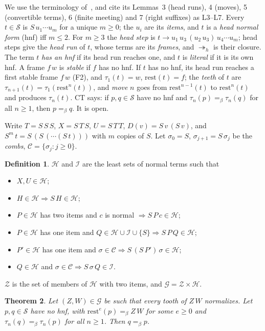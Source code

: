 \documentclass[11pt]{amsart}
\newtheorem{theorem}{Theorem}
\theoremstyle{definition}
\newtheorem{definition}[theorem]{Definition}
\newcommand{\Ter}{\mathcal S}
\newcommand{\hred}{\twoheadrightarrow_h}
\newcommand{\conv}{=_\beta}
\newcommand{\rest}{\mathrm{rest}}
\newcommand{\Hc}{\mathcal H}
\newcommand{\Ic}{\mathcal I}
\newcommand{\Gc}{\mathcal G}
\newcommand{\Cc}{\mathcal C}
\newcommand{\Zc}{\mathcal Z}
\begin{document}
We use the terminology of~\citep[\S\S1--2]{s11}, and cite its Lemmas~3 (head runs), 4 (moves),
5 (convertible terms), 6 (finite meeting) and 7 (right suffixes) as L3--L7. Every $t\in\Ter$ is
$S\,u_1\cdots u_m$ for a unique $m\ge0$; the $u_i$ are its \emph{items}, and $t$ is a \emph{head
normal form} (hnf) iff $m\le2$. For $m\ge3$ the \emph{head step} is
$t\to u_1\,u_3\,(u_2\,u_3)\,u_4\cdots u_m$; head steps give the \emph{head run} of $t$, whose terms
are its \emph{frames}, and $\hred$ is their closure. The term $t$ \emph{has an hnf} if its head run
reaches one, and $t$ is \emph{literal} if it is its own hnf. A frame $f\,w$ is \emph{stable} if $f$
has no hnf. If $t$ has no hnf, its head run reaches a first stable frame $f\,w$ (F2), and
$\tau_1(t)=w$, $\rest(t)=f$; the \emph{teeth} of $t$ are $\tau_{n+1}(t)=\tau_1(\rest^n(t))$, and
\emph{move} $n$ goes from $\rest^{n-1}(t)$ to $\rest^n(t)$ and produces $\tau_n(t)$. CT says: if
$p,q\in\Ter$ have no hnf and $\tau_n(p)\conv\tau_n(q)$ for all $n\ge1$, then $p\conv q$. It is open.

Write $T=S\,S\,S$, $X=S\,T\,S$, $U=S\,T\,T$, $D(v)=S\,v\,(S\,v)$, and $S^m\,t=S\,(S\,(\cdots(S\,t)))$
with $m$ copies of $S$. Let $\sigma_0=S$, $\sigma_{j+1}=S\,\sigma_j$ be the \emph{combs},
$\Cc=\{\sigma_j:j\ge0\}$.

\begin{definition}\label{def:grammar}
$\Hc$ and $\Ic$ are the least sets of normal terms such that
\begin{itemize}
\item[(H0)] $X,U\in\Hc$;
\item[(H1)] $H\in\Hc\Rightarrow S\,H\in\Hc$;
\item[(H2)] $P\in\Hc$ has two items and $c$ is normal $\Rightarrow S\,P\,c\in\Hc$;
\item[(H3)] $P\in\Hc$ has one item and $Q\in\Hc\cup\Ic\cup\{S\}\Rightarrow S\,P\,Q\in\Hc$;
\item[(H4)] $P'\in\Hc$ has one item and $\sigma\in\Cc\Rightarrow S\,(S\,P')\,\sigma\in\Hc$;
\item[(I)] $Q\in\Hc$ and $\sigma\in\Cc\Rightarrow S\,\sigma\,Q\in\Ic$.
\end{itemize}
$\Zc$ is the set of members of $\Hc$ with two items, and $\Gc=\Zc\times\Hc$.
\end{definition}

\begin{theorem}\label{thm:main}
Let $(Z,W)\in\Gc$ be such that every tooth of $Z\,W$ normalizes. Let $p,q\in\Ter$ have no hnf,
with $\rest^e(p)\conv Z\,W$ for some $e\ge0$ and $\tau_n(q)\conv\tau_n(p)$ for all $n\ge1$. Then
$q\conv p$.
\end{theorem}
\end{document}

